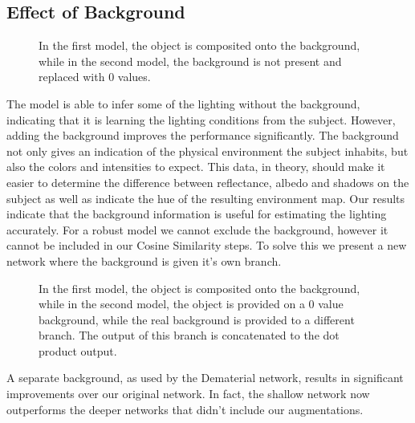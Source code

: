 \documentclass[ %
                    author={Gavin Parker},
                supervisor={Dr. Neill Campbell},
                    degree={MEng},
                     title={Deep Siamese Networks for Illumination Estimation from Stereo Images},
                  subtitle={},
                      type={Research},
                      year={2018} ]{dissertation}
\begin{document}
\subsection{Effect of Background}
\begin{figure}[H]
\setlength\figureheight{6cm}
\setlength\figurewidth{12cm}
\centering

\caption{In the first model, the object is composited onto the background, while in the second model, the background is not present and replaced with 0 values.}
\end{figure}
The model is able to infer some of the lighting without the background, indicating that it is learning the lighting conditions from the subject. However, adding the background improves the performance significantly. The background not only gives an indication of the physical environment the subject inhabits, but also the colors and intensities to expect. This data, in theory, should make it easier to determine the difference between reflectance, albedo and shadows on the subject as well as indicate the hue of the resulting environment map. Our results indicate that the background information is useful for estimating the lighting accurately. For a robust model we cannot exclude the background, however it cannot be included in our Cosine Similarity steps. To solve this we present a new network where the background is given it's own branch.
\begin{figure}[H]
\setlength\figureheight{6cm}
\setlength\figurewidth{12cm}
\centering

\caption{In the first model, the object is composited onto the background, while in the second model, the object is provided on a 0 value background, while the real background is provided to a different branch. The output of this branch is concatenated to the dot product output.}
\end{figure}
A separate background, as used by the Dematerial network, results in significant improvements over our original network. In fact, the shallow network now outperforms the deeper networks that didn't include our augmentations.
\end{document}

